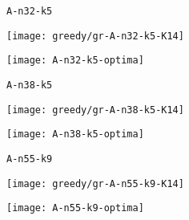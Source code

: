 \begin{figure}[H]
	\begin{minipage}{0.15\textwidth}
		\centering
		\texttt{A-n32-k5}
	\end{minipage}%
	\begin{minipage}{0.40\textwidth}
		\centering
		\texttt{[image: greedy/gr-A-n32-k5-K14]}\par
	\end{minipage}%
	\hspace{0.03\textwidth}
	\begin{minipage}{0.40\textwidth}
		\centering
		\texttt{[image: A-n32-k5-optima]}\par
	\end{minipage}%
\end{figure}

\begin{figure}[H]
	\begin{minipage}{0.15\textwidth}
		\centering
		\texttt{A-n38-k5}
	\end{minipage}%
	\begin{minipage}{0.40\textwidth}
		\centering
		\texttt{[image: greedy/gr-A-n38-k5-K14]}\par
	\end{minipage}%
	\hspace{0.03\textwidth}
	\begin{minipage}{0.40\textwidth}
		\centering
		\texttt{[image: A-n38-k5-optima]}\par
	\end{minipage}%
\end{figure}

\begin{figure}[H]
	\begin{minipage}{0.15\textwidth}
		\centering
		\texttt{A-n55-k9}
	\end{minipage}%
	\begin{minipage}{0.40\textwidth}
		\centering
		\texttt{[image: greedy/gr-A-n55-k9-K14]}\par
	\end{minipage}%
	\hspace{0.03\textwidth}
	\begin{minipage}{0.40\textwidth}
		\centering
		\texttt{[image: A-n55-k9-optima]}\par
	\end{minipage}%
\end{figure}

